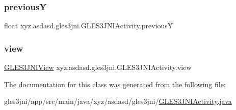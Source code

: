 \subsubsection{\texorpdfstring{previousY}{previousY}}
{\footnotesize\ttfamily float xyz.\+asdasd.\+gles3jni.\+G\+L\+E\+S3\+J\+N\+I\+Activity.\+previousY\hspace{0.3cm}{\ttfamily [private]}}

\mbox{\label{classxyz_1_1asdasd_1_1gles3jni_1_1_g_l_e_s3_j_n_i_activity_a2befb89b14e64b1080787351727f4121}} 
\subsubsection{\texorpdfstring{view}{view}}
{\footnotesize\ttfamily \hyperlink{classxyz_1_1asdasd_1_1gles3jni_1_1_g_l_e_s3_j_n_i_view}{G\+L\+E\+S3\+J\+N\+I\+View} xyz.\+asdasd.\+gles3jni.\+G\+L\+E\+S3\+J\+N\+I\+Activity.\+view\hspace{0.3cm}{\ttfamily [package]}}



The documentation for this class was generated from the following file\+:\begin{DoxyCompactItemize}
\item 
gles3jni/app/src/main/java/xyz/asdasd/gles3jni/\hyperlink{_g_l_e_s3_j_n_i_activity_8java}{G\+L\+E\+S3\+J\+N\+I\+Activity.\+java}\end{DoxyCompactItemize}
